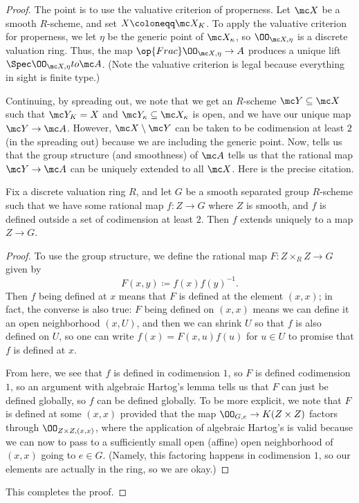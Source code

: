 \documentclass[../notes.tex]{subfiles}
\begin{document}
\begin{proof}
	The point is to use the valuative criterion of properness. Let $\mc X$ be a smooth $R$-scheme, and set $X\coloneqq\mc X_K$. To apply the valuative criterion for properness, we let $\eta$ be the generic point of $\mc X_\kappa$, so $\OO_{\mc X,\eta}$ is a discrete valuation ring. Thus, the map $\op{Frac}\OO_{\mc X,\eta}\to A$ produces a unique lift $\Spec\OO_{\mc X,\eta}to\mc A$. (Note the valuative criterion is legal because everything in sight is finite type.)

	Continuing, by spreading out, we note that we get an $R$-scheme $\mc Y\subseteq\mc X$ such that $\mc Y_K=X$ and $\mc Y_\kappa\subseteq\mc X_\kappa$ is open, and we have our unique map $\mc Y\to\mc A$. However, $\mc X\setminus\mc Y$ can be taken to be codimension at least $2$ (in the spreading out) because we are including the generic point. Now, \cite[Theorem~4.4.1]{blr-neron} tells us that the group structure (and smoothness) of $\mc A$ tells us that the rational map $\mc Y\to\mc A$ can be uniquely extended to all $\mc X$. Here is the precise citation.
	\begin{proposition}
		Fix a discrete valuation ring $R$, and let $G$ be a smooth separated group $R$-scheme such that we have some rational map $f\colon Z\to G$ where $Z$ is smooth, and $f$ is defined outside a set of codimension at least $2$. Then $f$ extends uniquely to a map $Z\to G$.
	\end{proposition}
	\begin{proof}
		To use the group structure, we define the rational map $F\colon Z\times_RZ\to G$ given by
		\[F(x,y)\coloneqq f(x)f(y)^{-1}.\]
		Then $f$ being defined at $x$ means that $F$ is defined at the element $(x,x)$; in fact, the converse is also true: $F$ being defined on $(x,x)$ means we can define it an open neighborhood $(x,U)$, and then we can shrink $U$ so that $f$ is also defined on $U$, so one can write $f(x)=F(x,u)f(u)$ for $u\in U$ to promise that $f$ is defined at $x$.
		
		From here, we see that $f$ is defined in codimension $1$, so $F$ is defined codimension $1$, so an argument with algebraic Hartog's lemma tells us that $F$ can just be defined globally, so $f$ can be defined globally. To be more explicit, we note that $F$ is defined at some $(x,x)$ provided that the map $\OO_{G,e}\to K(Z\times Z)$ factors through $\OO_{Z\times Z,(x,x)}$, where the application of algebraic Hartog's is valid because we can now to pass to a sufficiently small open (affine) open neighborhood of $(x,x)$ going to $e\in G$. (Namely, this factoring happens in codimension $1$, so our elements are actually in the ring, so we are okay.)
	\end{proof}
	This completes the proof.
\end{proof}
\end{document}
